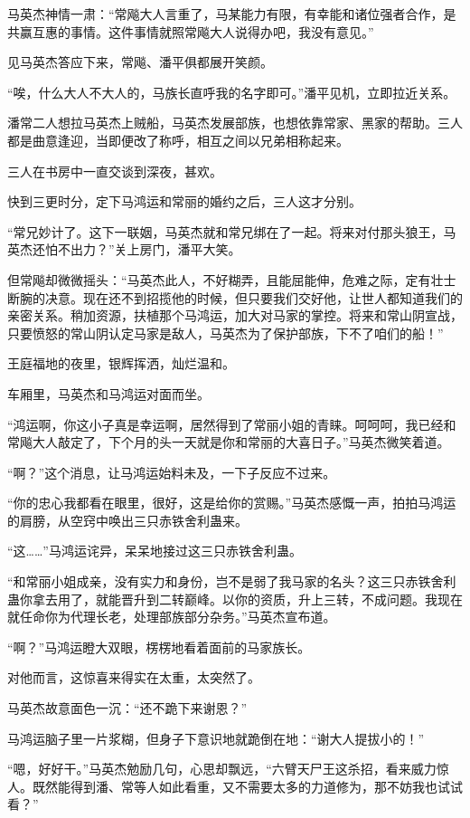 \begin{this_body}
马英杰神情一肃：“常飚大人言重了，马某能力有限，有幸能和诸位强者合作，是共赢互惠的事情。这件事情就照常飚大人说得办吧，我没有意见。”

见马英杰答应下来，常飚、潘平俱都展开笑颜。

“唉，什么大人不大人的，马族长直呼我的名字即可。”潘平见机，立即拉近关系。

潘常二人想拉马英杰上贼船，马英杰发展部族，也想依靠常家、黑家的帮助。三人都是曲意逢迎，当即便改了称呼，相互之间以兄弟相称起来。

三人在书房中一直交谈到深夜，甚欢。

快到三更时分，定下马鸿运和常丽的婚约之后，三人这才分别。

“常兄妙计了。这下一联姻，马英杰就和常兄绑在了一起。将来对付那头狼王，马英杰还怕不出力？”关上房门，潘平大笑。

但常飚却微微摇头：“马英杰此人，不好糊弄，且能屈能伸，危难之际，定有壮士断腕的决意。现在还不到招揽他的时候，但只要我们交好他，让世人都知道我们的亲密关系。稍加资源，扶植那个马鸿运，加大对马家的掌控。将来和常山阴宣战，只要愤怒的常山阴认定马家是敌人，马英杰为了保护部族，下不了咱们的船！”

王庭福地的夜里，银辉挥洒，灿烂温和。

车厢里，马英杰和马鸿运对面而坐。

“鸿运啊，你这小子真是幸运啊，居然得到了常丽小姐的青睐。呵呵呵，我已经和常飚大人敲定了，下个月的头一天就是你和常丽的大喜日子。”马英杰微笑着道。

“啊？”这个消息，让马鸿运始料未及，一下子反应不过来。

“你的忠心我都看在眼里，很好，这是给你的赏赐。”马英杰感慨一声，拍拍马鸿运的肩膀，从空窍中唤出三只赤铁舍利蛊来。

“这……”马鸿运诧异，呆呆地接过这三只赤铁舍利蛊。

“和常丽小姐成亲，没有实力和身份，岂不是弱了我马家的名头？这三只赤铁舍利蛊你拿去用了，就能晋升到二转巅峰。以你的资质，升上三转，不成问题。我现在就任命你为代理长老，处理部族部分杂务。”马英杰宣布道。

“啊？”马鸿运瞪大双眼，楞楞地看着面前的马家族长。

对他而言，这惊喜来得实在太重，太突然了。

马英杰故意面色一沉：“还不跪下来谢恩？”

马鸿运脑子里一片浆糊，但身子下意识地就跪倒在地：“谢大人提拔小的！”

“嗯，好好干。”马英杰勉励几句，心思却飘远，“六臂天尸王这杀招，看来威力惊人。既然能得到潘、常等人如此看重，又不需要太多的力道修为，那不妨我也试试看？”


\end{this_body}
